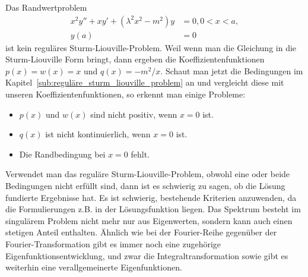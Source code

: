 \begin{beispiel}
	Das Randwertproblem
	\[
		\begin{aligned}
		x^2y'' + xy' + (\lambda^2x^2 - m^2)y &= 0, 0<x<a,\\
		y(a) &= 0
		\end{aligned}
	\]
	ist kein reguläres Sturm-Liouville-Problem.
	Weil wenn man die Gleichung in die Sturm-Liouville Form bringt, dann ergeben die Koeffizientenfunktionen $p(x) = w(x) = x$ und $q(x) = -m^2/x$.
	Schaut man jetzt die Bedingungen im Kapitel~\ref{sub:reguläre_sturm_liouville_problem} an und vergleicht diese mit unseren Koeffizientenfunktionen, so erkennt man einige Probleme:
	\begin{itemize}
		\item $p(x)$ und $w(x)$ sind nicht positiv, wenn $x = 0$ ist.
		\item $q(x)$ ist nicht kontinuierlich, wenn $x = 0$ ist.
		\item Die Randbedingung bei $x = 0$ fehlt.
	\end{itemize}
\end{beispiel}

Verwendet man das reguläre Sturm-Liouville-Problem, obwohl eine oder beide Bedingungen nicht erfüllt sind, dann ist es schwierig zu sagen, ob die Lösung fundierte Ergebnisse hat.
Es ist schwierig, bestehende Kriterien anzuwenden, da die Formulierungen z.B. in der Lösungsfunktion liegen.
Das Spektrum besteht im singulärem Problem nicht mehr nur aus Eigenwerten, sondern kann auch einen stetigen Anteil enthalten.
Ähnlich wie bei der Fourier-Reihe gegenüber der Fourier-Transformation gibt es immer noch eine zugehörige Eigenfunktionsentwicklung, und zwar die Integraltransformation sowie gibt es weiterhin eine verallgemeinerte Eigenfunktionen.
